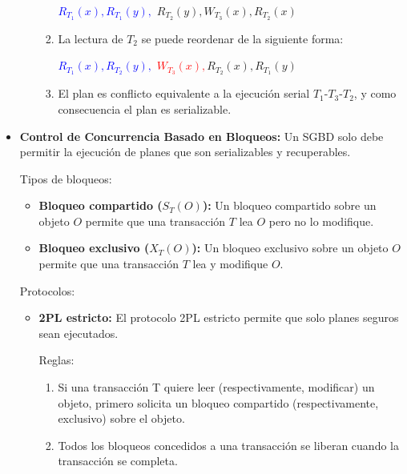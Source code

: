 \documentclass{templateNote}
\begin{document}
\begin{itemize}
\begin{itemize}
\begin{enumerate}
            \textcolor{blue}{$R_{T_1}(x), R_{T_1}(y),$} $R_{T_2}(y), W_{T_3}(x), R_{T_2}(x)$

            \item La lectura de $T_2$ se puede reordenar de la siguiente forma:
            
            \textcolor{blue}{$R_{T_1}(x), R_{T_2}(y),$} \textcolor{red}{$W_{T_3}(x),$}\textcolor{green!80!black}{$R_{T_2}(x), R_{T_1}(y)$}

            \item El plan es conflicto equivalente a la ejecución serial $T_1$-$T_3$-$T_2$, y como consecuencia el plan es serializable.
        \end{enumerate}
    \end{itemize}

    \item \textbf{Control de Concurrencia Basado en Bloqueos:} Un SGBD solo debe permitir la ejecución de planes que son
    serializables y recuperables.
    
    Tipos de bloqueos:
    \begin{itemize}
        \item \textbf{Bloqueo compartido ($S_T(O)$):} Un bloqueo compartido sobre un objeto $O$ permite que una transacción $T$ lea $O$ pero no lo modifique.

        \item \textbf{Bloqueo exclusivo ($X_T(O)$):} Un bloqueo exclusivo sobre un objeto $O$ permite que una transacción $T$ lea y modifique $O$.
    \end{itemize}

    Protocolos:
    \begin{itemize}
        \item \textbf{2PL estricto:} El protocolo 2PL estricto permite que solo planes seguros sean ejecutados.

        Reglas:
        \begin{enumerate}
            \item Si una transacción T quiere leer (respectivamente, modificar) un objeto, primero solicita un bloqueo compartido (respectivamente, exclusivo) sobre el objeto.
            
            \item Todos los bloqueos concedidos a una transacción se liberan cuando la transacción se completa.
        \end{enumerate}


\end{itemize}
\end{itemize}
\end{document}
